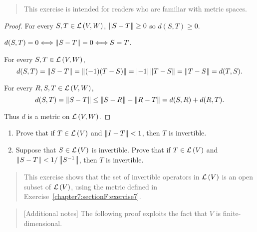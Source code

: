 \begin{quote}
    This exercise is intended for readers who are familiar with metric spaces.
\end{quote}

\begin{proof}
    For every $S, T\in\mathcal{L}\left({V, W}\right)$, $\left\Vert{S - T}\right\Vert\geq 0$ so $d(S, T)\geq 0$.

    $d(S, T) = 0 \Longleftrightarrow \left\Vert{S - T}\right\Vert = 0 \Longleftrightarrow S = T$.

    For every $S, T\in\mathcal{L}\left({V, W}\right)$,
    \[
        d(S, T) = \left\Vert{S - T}\right\Vert = \left\Vert{(-1)(T - S)}\right\Vert = \left\vert{-1}\right\vert\left\Vert{T - S}\right\Vert = \left\Vert{T - S}\right\Vert = d(T, S).
    \]

    For every $R, S, T\in\mathcal{L}\left({V, W}\right)$,
    \[
        d(S, T) = \left\Vert{S - T}\right\Vert\leq \left\Vert{S - R}\right\Vert + \left\Vert{R - T}\right\Vert = d(S, R) + d(R, T).
    \]

    Thus $d$ is a metric on $\mathcal{L}\left({V, W}\right)$.
\end{proof}
\newpage

\begin{exercise}
    \begin{enumerate}[label={(\alph*)}]
        \item Prove that if $T\in\mathcal{L}\left({V}\right)$ and $\left\Vert{I - T}\right\Vert < 1$, then $T$ is invertible.
        \item Suppose that $S\in\mathcal{L}\left({V}\right)$ is invertible. Prove that if $T\in\mathcal{L}\left({V}\right)$ and $\left\Vert{S - T}\right\Vert < 1/\left\Vert{S^{-1}}\right\Vert$, then $T$ is invertible.
    \end{enumerate}
\end{exercise}

\begin{quote}
    This exercise shows that the set of invertible operators in $\mathcal{L}\left({V}\right)$ is an open subset of $\mathcal{L}\left({V}\right)$, using the metric defined in Exercise~\ref{chapter7:sectionF:exercise7}.
\end{quote}

\begin{quote}[Additional notes]
    The following proof exploits the fact that $V$ is finite-dimensional.
\end{quote}

